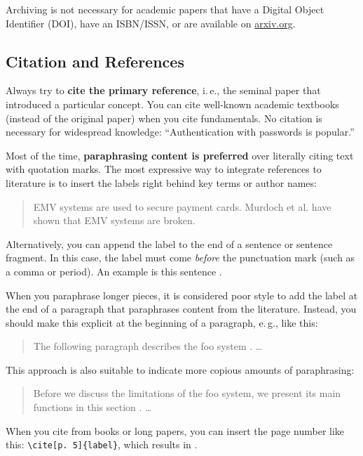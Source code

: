 Archiving is not necessary for academic papers that have a Digital Object Identifier (DOI), have an ISBN/ISSN, or are available on \url{arxiv.org}.


\subsection{Citation and References}

Always try to \textbf{cite the primary reference},
i.\,e., the seminal paper that introduced a particular concept. You can cite well-known academic textbooks (instead of the original paper) when you cite fundamentals. No citation is necessary for widespread knowledge: ``Authentication with passwords is popular.''

Most of the time, \textbf{paraphrasing content is preferred} over literally citing text with quotation marks. The most expressive way to integrate references to literature is to insert the labels right behind key terms or author names:
\begin{quote}
  EMV systems \cite{anderson_ross_emv:_2014} are used to secure payment cards. Murdoch et al. \cite{murdoch_steven_j._chip_2010} have shown that EMV systems are broken.
\end{quote}

Alternatively, you can append the label to the end of a sentence or sentence fragment. In this case, the label must come \emph{before} the punctuation mark (such as a comma or period). An example is this sentence \cite{Hintz02}.

When you paraphrase longer pieces, it is considered poor style to add the label at the end of a paragraph that paraphrases content from the literature. Instead, you should make this explicit at the beginning of a paragraph, e.\,g., like this:
\begin{quote}
  The following paragraph describes the foo system \cite{kou_weidong_secure_2003}. …
\end{quote}

This approach is also suitable to indicate more copious amounts of paraphrasing:
\begin{quote}
  Before we discuss the limitations of the foo system, we present its main functions in this section \cite{kou_weidong_secure_2003}. …
\end{quote}

When you cite from books or long papers, you can insert the page number like this: \verb|\cite[p. 5]{label}|, which results in \cite[p. 5]{kou_weidong_secure_2003}.

